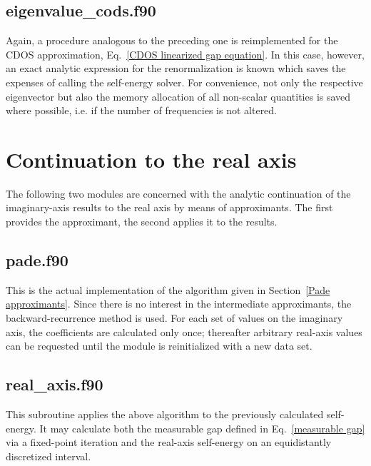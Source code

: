 

\subsection{eigenvalue\_cods.f90}

Again, a procedure analogous to the preceding one is reimplemented for the CDOS
approximation, Eq.~\ref{CDOS linearized gap equation}. In this case, however, an
exact analytic expression for the renormalization is known which saves the
expenses of calling the self-energy solver. For convenience, not only the
respective eigenvector but also the memory allocation of all non-scalar
quantities is saved where possible, i.e. if the number of 
frequencies is not altered.



\section{Continuation to the real axis}
\label{real_axis}

The following two modules are concerned with the analytic continuation of the
imaginary-axis results to the real axis by means of  approximants.
The first provides the approximant, the second applies it to the results.

\subsection{pade.f90}

This is the actual implementation of the algorithm given in Section~\ref{Pade
approximants}. Since there is no interest in the intermediate approximants, the
backward-recurrence method is used. For each set of values on the imaginary
axis, the coefficients are calculated only once; thereafter arbitrary real-axis
values can be requested until the module is reinitialized with a new data set.



\subsection{real\_axis.f90}

This subroutine applies the above algorithm to the previously calculated
self-energy. It may calculate both the measurable gap defined in
Eq.~\ref{measurable gap} via a fixed-point iteration and the real-axis
self-energy on an equidistantly discretized interval.

